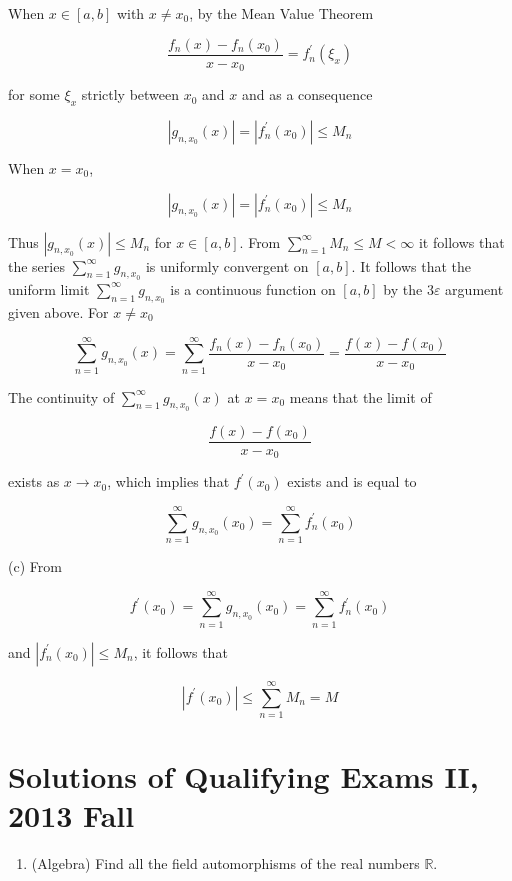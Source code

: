 \documentclass[10pt]{article}
\begin{document}
When $x \in[a, b]$ with $x \neq x_{0}$, by the Mean Value Theorem

$$
\frac{f_{n}(x)-f_{n}\left(x_{0}\right)}{x-x_{0}}=f_{n}^{\prime}\left(\xi_{x}\right)
$$

for some $\xi_{x}$ strictly between $x_{0}$ and $x$ and as a consequence

$$
\left|g_{n, x_{0}}(x)\right|=\left|f_{n}^{\prime}\left(x_{0}\right)\right| \leq M_{n}
$$

When $x=x_{0}$,

$$
\left|g_{n, x_{0}}(x)\right|=\left|f_{n}^{\prime}\left(x_{0}\right)\right| \leq M_{n}
$$

Thus $\left|g_{n, x_{0}}(x)\right| \leq M_{n}$ for $x \in[a, b]$. From $\sum_{n=1}^{\infty} M_{n} \leq M<\infty$ it follows that the series $\sum_{n=1}^{\infty} g_{n, x_{0}}$ is uniformly convergent on $[a, b]$. It follows that the uniform limit $\sum_{n=1}^{\infty} g_{n, x_{0}}$ is a continuous function on $[a, b]$ by the $3 \varepsilon$ argument given above. For $x \neq x_{0}$

$$
\sum_{n=1}^{\infty} g_{n, x_{0}}(x)=\sum_{n=1}^{\infty} \frac{f_{n}(x)-f_{n}\left(x_{0}\right)}{x-x_{0}}=\frac{f(x)-f\left(x_{0}\right)}{x-x_{0}}
$$

The continuity of $\sum_{n=1}^{\infty} g_{n, x_{0}}(x)$ at $x=x_{0}$ means that the limit of

$$
\frac{f(x)-f\left(x_{0}\right)}{x-x_{0}}
$$

exists as $x \rightarrow x_{0}$, which implies that $f^{\prime}\left(x_{0}\right)$ exists and is equal to

$$
\sum_{n=1}^{\infty} g_{n, x_{0}}\left(x_{0}\right)=\sum_{n=1}^{\infty} f_{n}^{\prime}\left(x_{0}\right)
$$

(c) From

$$
f^{\prime}\left(x_{0}\right)=\sum_{n=1}^{\infty} g_{n, x_{0}}\left(x_{0}\right)=\sum_{n=1}^{\infty} f_{n}^{\prime}\left(x_{0}\right)
$$

and $\left|f_{n}^{\prime}\left(x_{0}\right)\right| \leq M_{n}$, it follows that

$$
\left|f^{\prime}\left(x_{0}\right)\right| \leq \sum_{n=1}^{\infty} M_{n}=M
$$

\section{Solutions of Qualifying Exams II, 2013 Fall}
\begin{enumerate}
  \item (Algebra) Find all the field automorphisms of the real numbers $\mathbb{R}$.
\end{enumerate}
\end{document}

